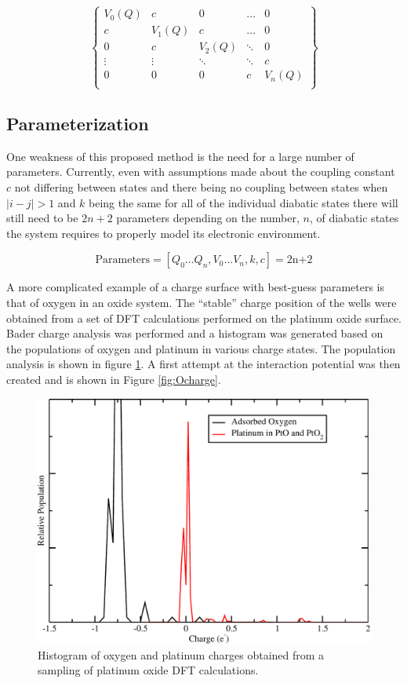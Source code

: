 \begin{equation}
  \begin{Bmatrix}
    V_0(Q) & c      & 0      & \dots  & 0\\
    c      & V_1(Q) & c      & \dots & 0\\
    0      & c      & V_2(Q) & \ddots & 0 \\
    \vdots & \vdots & \ddots & \ddots & c\\
    0      & 0      & 0      &  c     & V_n(Q) \\
    \end{Bmatrix}
\end{equation}

\subsection{Parameterization}
One weakness of this proposed method is the need for a large number of
parameters.  Currently, even with assumptions made about the coupling constant
$c$ not differing between states and there being no coupling between states
when $|i-j| > 1$  and $k$ being the same for all of the individual diabatic
states there will still need to be $2n+2$ parameters depending on the number, $n$, of
diabatic states the system requires to properly model its electronic
environment.

\begin{equation*}
\text{Parameters} = [Q_0 \dots Q_n, V_0 \dots V_n, k, c] = \text{2n+2}
\end{equation*}

A more complicated example of a charge surface with best-guess parameters is
that of oxygen in an oxide system.  The ``stable'' charge position of the wells
were obtained from a set of DFT calculations performed on the platinum oxide
surface. Bader charge analysis was performed and a histogram was generated
based on the populations of oxygen and platinum in various charge states. The population analysis
is shown in figure \ref{fig:population}. A first attempt at the interaction
potential was then created and is shown in Figure \ref{fig:Ocharge}.

\begin{figure}
  \centering
  \includegraphics[width=0.75\linewidth]{../figures/chap5/chgDist_PtO.pdf}
  \caption{Histogram of oxygen and platinum charges obtained from a sampling of platinum oxide DFT calculations.}
\label{fig:population}
\end{figure}

